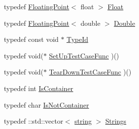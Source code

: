 \begin{DoxyCompactItemize}
typedef \hyperlink{classtesting_1_1internal_1_1FloatingPoint}{\-Floating\-Point}$<$ float $>$ \hyperlink{namespacetesting_1_1internal_ac9c0c59007cb41f8937e5adbef20b1e8}{\-Float}
\item 
typedef \hyperlink{classtesting_1_1internal_1_1FloatingPoint}{\-Floating\-Point}$<$ double $>$ \hyperlink{namespacetesting_1_1internal_a6c60ea293c4bfb29b9e7d03ac89202c1}{\-Double}
\item 
typedef const void $\ast$ \hyperlink{namespacetesting_1_1internal_ac8e91f0c6a06c0361dc3152ddfeb2342}{\-Type\-Id}
\item 
typedef void($\ast$ \hyperlink{namespacetesting_1_1internal_abdd2548fdbf05907e439e416dab030ec}{\-Set\-Up\-Test\-Case\-Func} )()
\item 
typedef void($\ast$ \hyperlink{namespacetesting_1_1internal_a0d7d11b7ce3a8f9d969e0dfb543dde3d}{\-Tear\-Down\-Test\-Case\-Func} )()
\item 
typedef int \hyperlink{namespacetesting_1_1internal_a352c9f642298e3ae8c7eb84e3278ba65}{\-Is\-Container}
\item 
typedef char \hyperlink{namespacetesting_1_1internal_a7702df52e064b640254945414578e90c}{\-Is\-Not\-Container}
\item 
typedef \-::std\-::vector$<$ \hyperlink{namespacetesting_1_1internal_a9882e571372fc19a02d2b2949e1f1557}{string} $>$ \hyperlink{namespacetesting_1_1internal_a6d618e88721d4c38cbecabe0d2e8341c}{\-Strings}
\end{DoxyCompactItemize}
